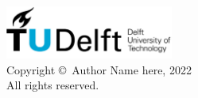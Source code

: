 \begin{flushleft}
  \vspace*{15cm}
  \thispagestyle{empty}
  \noindent%
  \includegraphics[width=55mm]{layout/tudelft/logo.png}\\  
  Copyright \copyright\ Author Name here, 2022 \\
  All rights reserved.
\end{flushleft}
